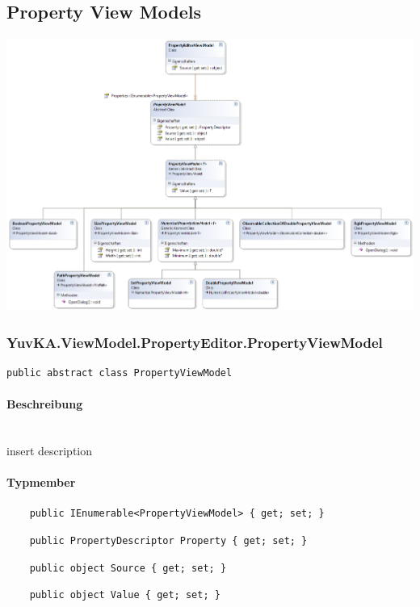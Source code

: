 \subsection{Property View Models}


\includegraphics[width=\textwidth]{YuvKA.ViewModel.PropertyEditor/propertyEditor.png}



\subsubsection{YuvKA.ViewModel.PropertyEditor.PropertyViewModel}

\begin{verbatim}
public abstract class PropertyViewModel
\end{verbatim}

\paragraph{Beschreibung}~\\
insert description

\paragraph{Typmember}
\begin{itemize}

	\begin{verbatim}
	public IEnumerable<PropertyViewModel> { get; set; }
	\end{verbatim}
	
	\begin{verbatim}
	public PropertyDescriptor Property { get; set; }
	\end{verbatim}

	\begin{verbatim}
	public object Source { get; set; }
	\end{verbatim}

	\begin{verbatim}
	public object Value { get; set; }
	\end{verbatim}

\end{itemize}




